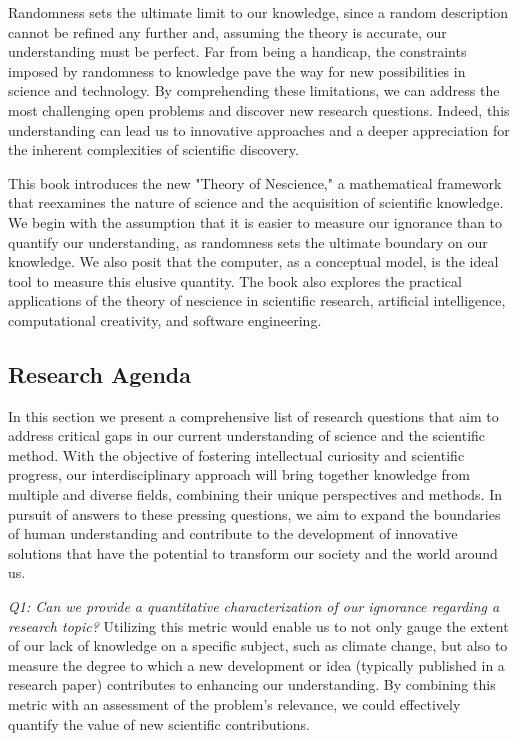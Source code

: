 Randomness sets the ultimate limit to our knowledge, since a random description cannot be refined any further and, assuming the theory is accurate, our understanding must be perfect. Far from being a handicap, the constraints imposed by randomness to knowledge pave the way for new possibilities in science and technology. By comprehending these limitations, we can address the most challenging open problems and discover new research questions. Indeed, this understanding can lead us to innovative approaches and a deeper appreciation for the inherent complexities of scientific discovery.

This book introduces the new "Theory of Nescience," a mathematical framework that reexamines the nature of science and the acquisition of scientific knowledge. We begin with the assumption that it is easier to measure our ignorance than to quantify our understanding, as randomness sets the ultimate boundary on our knowledge. We also posit that the computer, as a conceptual model, is the ideal tool to measure this elusive quantity. The book also explores the practical applications of the theory of nescience in scientific research, artificial intelligence, computational creativity, and software engineering.

%
%

\subsection*{Research Agenda}

In this section we present a comprehensive list of research questions that aim to address critical gaps in our current understanding of science and the scientific method. With the objective of fostering intellectual curiosity and scientific progress, our interdisciplinary approach will bring together knowledge from multiple and diverse fields, combining their unique perspectives and methods. In pursuit of answers to these pressing questions, we aim to expand the boundaries of human understanding and contribute to the development of innovative solutions that have the potential to transform our society and the world around us.

\emph{Q1: Can we provide a quantitative characterization of our ignorance regarding a research topic?} Utilizing this metric would enable us to not only gauge the extent of our lack of knowledge on a specific subject, such as climate change, but also to measure the degree to which a new development or idea (typically published in a research paper) contributes to enhancing our understanding. By combining this metric with an assessment of the problem's relevance, we could effectively quantify the value of new scientific contributions.

